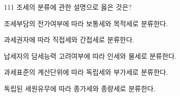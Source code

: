 \begin{question}{111}
조세의 분류에 관한 설명으로 옳은 것은?
\begin{choices}
  \item 조세부담의 전가여부에 따라 보통세와 목적세로 분류한다.
  \item 과세권자에 따라 직접세와 간접세로 분류한다.
  \item 납세자의 담세능력 고려여부에 따라 인세와 물세로 분류한다.
  \item 과세표준의 계산단위에 따라 독립세와 부가세로 분류한다.
  \item 독립된 세원유무에 따라 종가세와 종량세로 분류한다.
\end{choices}
\end{question}
